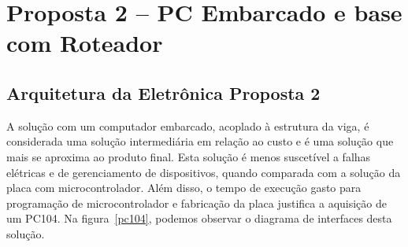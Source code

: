 


\section{Proposta 2 – PC Embarcado e base com Roteador}

\subsection{Arquitetura da Eletrônica Proposta 2}
A solução com um computador embarcado, acoplado à estrutura da viga, é
considerada uma solução intermediária em relação ao custo e é uma solução que
mais se aproxima ao produto final. Esta solução é menos suscetível a falhas
elétricas e de gerenciamento de dispositivos, quando comparada com a solução da
placa com microcontrolador. Além disso, o tempo de execução gasto para programação de microcontrolador e fabricação da placa justifica a aquisição de um PC104. Na figura~\ref{pc104}, podemos observar o diagrama de interfaces desta solução.

